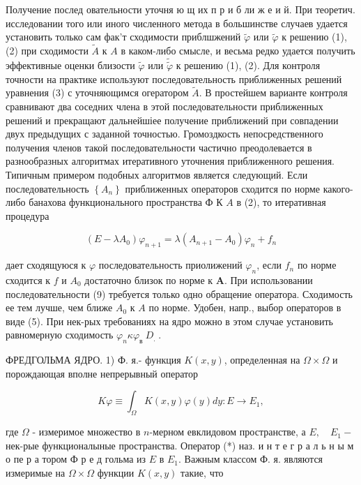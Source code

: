 \documentclass[10pt]{article}
\begin{document}
Получение послед овательности уточня ю щ их п р и б ли ж е и й. При теоретич. исследовании того или иного численного метода в большинстве случаев удается установить только сам фак'т сходимости приблшжений $\tilde{\varphi}$ или $\tilde{\varphi}$ к решению (1), (2) при сходимости $\tilde{A}$ к $A$ в каком-либо смысле, и весьма редко удается получить эффективные оценки близости $\tilde{\varphi}$ или $\tilde{\tilde{\varphi}}$ к решению (1), (2). Для контроля точности на практике используют последовательность приближенных решений уравнения (3) с уточняющимся огератором $\tilde{A}$. В простейшем варианте контроля сравнивают два соседних члена в этой последовательности приближенных решений и прекращают дальнейшіее получение приближений при совпадении двух предыдущих с заданной точностью. Громоздкость непосредственного получения членов такой последовательности частично преодолевается в разнообразных алгоритмах итеративного уточнения приближенного решения. Типичным примером подобных алгоритмов является следующий. Если последовательность $\left\{A_{n}\right\}$ приближенных операторов сходится по норме какого-либо банахова функционального пространства Ф К $A$ в (2), то итеративная процедура



\[

\left(E-\lambda A_{0}\right) \varphi_{n+1}=\lambda\left(A_{n+1}-A_{0}\right) \varphi_{n}+f_{n}

\]



дает сходящуюся к $\varphi$ последовательность приолижений $\varphi_{n}$, если $f_{n}$ по норме сходится к $f$ и $A_{0}$ достаточно близок по норме к $\boldsymbol{A}$. При использовании последовательности (9) требуется только одно обращение оператора. Сходимость ее тем лучше, чем ближе $A_{0}$ к $A$ по норме. Удобен, напр., выбор операторов в виде (5). При нек-рых требованиях на ядро можно в этом случае установить равномерную сходимость $\varphi_{n} \kappa \varphi_{\text {в }} D_{\text {. }}$.



ФРЕДГОЛЬМА ЯДРО. 1) Ф. я.- функция $K(x, y)$, определенная на $\Omega \times \Omega$ и порождающая вполне непрерывный оператор



\[

K \varphi \equiv \int_{\Omega} K(x, y) \varphi(y) d y: E \rightarrow E_{1},

\]



где $\Omega$ - измеримое множество в $n$-мерном евклидовом пространстве, а $E, \quad E_{1}-$ нек-рые функционалыные пространства. Оператор (*) наз. и н т е г р а л ь н ы м о пе р а тором Ф р е д гольма из $E$ в $E_{1}$. Важным классом Ф. я. являются измеримые на $\Omega \times \Omega$ функции $K(x, y)$ такие, что
\end{document}
